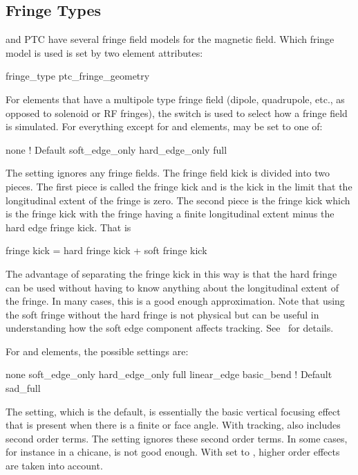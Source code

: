 \subsection{Fringe Types}
\label{s:fringe.trype}

\bmad and PTC have several fringe field models for the magnetic field. Which fringe
model is used is set by two element attributes:
\begin{example}
  fringe_type
  ptc_fringe_geometry
\end{example}

For elements that have a multipole type fringe field (dipole, quadrupole, etc., as opposed
to solenoid or RF fringes), the  switch is used to select how a fringe
field is simulated.  For everything except for  and  elements,
 may be set to one of:
\begin{example}
  none              ! Default 
  soft_edge_only
  hard_edge_only
  full
\end{example}
The  setting ignores any fringe fields.  The fringe field kick is divided into
two pieces.  The first piece is called the  fringe kick and is the kick in
the limit that the longitudinal extent of the fringe is zero. The second piece is the
 fringe kick which is the fringe kick with the fringe having a finite
longitudinal extent minus the hard edge fringe kick. That is
\begin{example}
  fringe kick = hard fringe kick + soft fringe kick
\end{example}
The advantage of separating the fringe kick in this way is that the hard fringe can be
used without having to know anything about the longitudinal extent of the fringe.  In many
cases, this is a good enough approximation. Note that using the soft fringe without the
hard fringe is not physical but can be useful in understanding how the soft edge component
affects tracking.  See~ for details.

For  and  elements, the possible 
settings are:
\begin{example}
  none
  soft_edge_only
  hard_edge_only
  full
  linear_edge
  basic_bend        ! Default 
  sad_full
\end{example}
The  setting, which is the default, is essentially the
basic vertical focusing effect that is present when there is a finite
 or  face angle. With  tracking,
 also includes second order terms.  The
 setting ignores these second order terms.  In some
cases, for instance in a chicane,  is not good
enough. With  set to , higher order effects
are taken into account.

